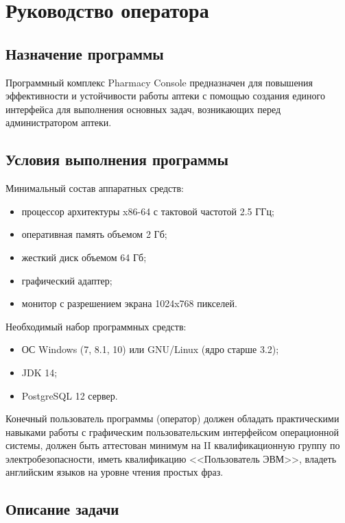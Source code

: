 \section{Руководство оператора}


\subsection{Назначение программы}

Программный комплекс Pharmacy Console предназначен для повышения эффективности
и устойчивости работы аптеки с помощью создания единого интерфейса для
выполнения основных задач, возникающих перед администратором аптеки.

\subsection{Условия выполнения программы}

Минимальный состав аппаратных средств:
\begin{itemize}
    \item процессор архитектуры x86-64 с тактовой частотой 2.5 ГГц;
    \item оперативная память объемом 2 Гб;
    \item жесткий диск объемом 64 Гб;
    \item графический адаптер;
    \item монитор с разрешением экрана 1024x768 пикселей.
\end{itemize}

Необходимый набор программных средств:
\begin{itemize}
    \item ОС Windows (7, 8.1, 10) или GNU/Linux (ядро старше 3.2);
    \item JDK 14;
    \item PostgreSQL 12 сервер.
\end{itemize}

Конечный пользователь программы (оператор) должен обладать
практическими навыками работы с графическим пользовательским интерфейсом
операционной системы, должен быть аттестован минимум на II квалификационную
группу по электробезопасности, иметь квалификацию <<Пользователь ЭВМ>>, владеть
английским языков на уровне чтения простых фраз.

\subsection{Описание задачи}

